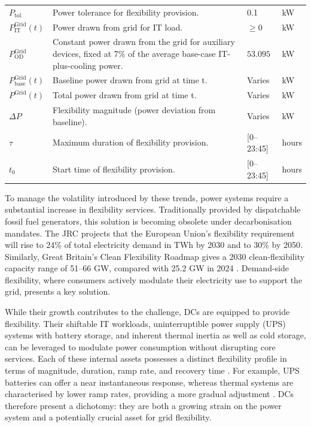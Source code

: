 \documentclass[lettersize,journal]{IEEEtran}
\newcommand{\rev}[1]{#1}
\begin{document}
{{\begin{longtable}{p{} p{} p{} p{}}
$P_{\mathrm{tol}}$ & Power tolerance for flexibility provision. & 0.1 &kW \\
$P^{\mathrm{Grid}}_{\mathrm{IT}}(t)$ & Power drawn from grid for IT load. & $\geq 0$ &kW \\
$P^{\mathrm{Grid}}_{\mathrm{OD}}$ & \rev{Constant power drawn from the grid for auxiliary devices, fixed at 7\% of the average base-case IT-plus-cooling power.} & $53.095$ &kW \\
$P^{\mathrm{Grid}}_{\mathrm{base}}(t)$ & Baseline power drawn from grid at time t. & Varies &kW \\
$P^{\mathrm{Grid}}(t)$ & Total power drawn from grid at time t. & Varies &kW \\
$\Delta P$ & Flexibility magnitude (power deviation from baseline). & Varies &kW \\
$\tau$ & Maximum duration of flexibility provision. & [0–23:45] & hours \\
$t_0$ & Start time of flexibility provision. & [0–23:45] & hours \\
\end{longtable}
\twocolumn
}
} %
\fi
To manage the volatility introduced by these trends, power systems require a substantial increase in flexibility services. Traditionally provided by dispatchable fossil fuel generators, this solution is becoming obsolete under decarbonisation mandates. The JRC \cite{koolen2023flexibility} projects that the European Union's flexibility requirement will rise to 24\% of total electricity demand in TWh by 2030 and to 30\% by 2050. Similarly, Great Britain's Clean Flexibility Roadmap gives a 2030 clean-flexibility capacity range of 51--66 GW, compared with 25.2 GW in 2024 \cite{clean_flexibility_roadmap}. Demand-side flexibility, where consumers actively modulate their electricity use to support the grid, presents a key solution.

While their growth contributes to the challenge, DCs are equipped to provide flexibility. Their shiftable IT workloads, uninterruptible power supply (UPS) systems with battery storage, and inherent thermal inertia as well as cold storage, can be leveraged to modulate power consumption without disrupting core services. Each of these internal assets possesses a distinct flexibility profile in terms of magnitude, duration, ramp rate, and recovery time \cite{zhang2025unlocking}. For example, UPS batteries can offer a near instantaneous response, whereas thermal systems are characterised by lower ramp rates, providing a more gradual adjustment \cite{zhang2025unlocking, alapera2018data}. DCs therefore present a dichotomy: they are both a growing strain on the power system and a potentially crucial asset for grid flexibility.
\end{document}

